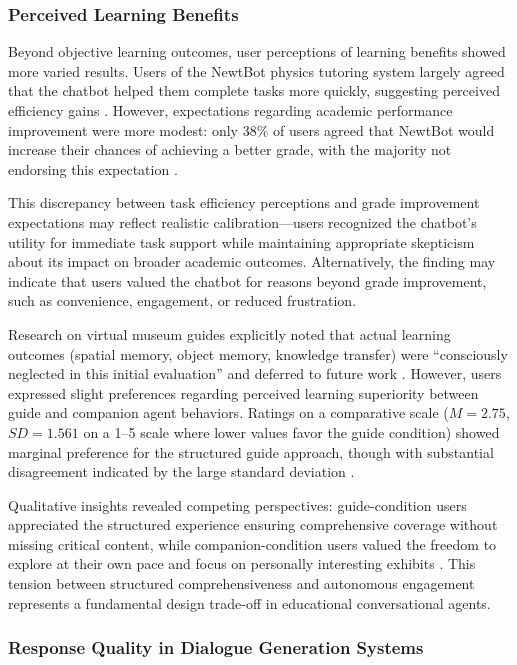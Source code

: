 \documentclass[manuscript,anonymous,sigconf]{acmart}
\begin{document}
\subsubsection{Perceived Learning Benefits}

Beyond objective learning outcomes, user perceptions of learning benefits showed more varied results. Users of the NewtBot physics tutoring system largely agreed that the chatbot helped them complete tasks more quickly, suggesting perceived efficiency gains \cite{A22}. However, expectations regarding academic performance improvement were more modest: only 38\% of users agreed that NewtBot would increase their chances of achieving a better grade, with the majority not endorsing this expectation \cite{A22}.

This discrepancy between task efficiency perceptions and grade improvement expectations may reflect realistic calibration---users recognized the chatbot's utility for immediate task support while maintaining appropriate skepticism about its impact on broader academic outcomes. Alternatively, the finding may indicate that users valued the chatbot for reasons beyond grade improvement, such as convenience, engagement, or reduced frustration.

Research on virtual museum guides explicitly noted that actual learning outcomes (spatial memory, object memory, knowledge transfer) were ``consciously neglected in this initial evaluation'' and deferred to future work \cite{A82}. However, users expressed slight preferences regarding perceived learning superiority between guide and companion agent behaviors. Ratings on a comparative scale ($M = 2.75$, $SD = 1.561$ on a 1--5 scale where lower values favor the guide condition) showed marginal preference for the structured guide approach, though with substantial disagreement indicated by the large standard deviation \cite{A82}.

Qualitative insights revealed competing perspectives: guide-condition users appreciated the structured experience ensuring comprehensive coverage without missing critical content, while companion-condition users valued the freedom to explore at their own pace and focus on personally interesting exhibits \cite{A82}. This tension between structured comprehensiveness and autonomous engagement represents a fundamental design trade-off in educational conversational agents.

\subsubsection{Response Quality in Dialogue Generation Systems}
\end{document}
